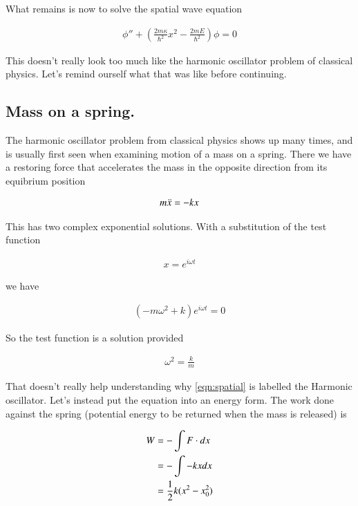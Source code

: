 \documentclass{article}
\begin{document}
What remains is now to solve the spatial wave equation

\begin{align}\label{eqn:spatial}
\phi'' + \left( \frac{2 m \kappa}{\hbar^2} x^2 - \frac{2m E}{\hbar^2}\right) \phi = 0
\end{align}

This doesn't really look too much like the harmonic oscillator problem of classical physics.  Let's remind ourself
what that was like before continuing.

\subsection{ Mass on a spring. }

The harmonic oscillator problem from classical physics
shows up many times, and is usually first seen when examining motion
of a mass on a spring.  There we have a restoring force that accelerates the
mass in the opposite direction from its equibrium position

\begin{align}
m \ddot{x} = -k x
\end{align}

This has two complex exponential solutions.  With a substitution of the test function

\begin{align*}
x = e^{i \omega t}
\end{align*}

we have

\begin{align*}
(-m \omega^2 + k) e^{i \omega t} = 0
\end{align*}

So the test function is a solution provided

\begin{align*}
\omega^2 = \frac{k}{m}
\end{align*}

That doesn't really help understanding why \ref{eqn:spatial} is labelled the Harmonic oscillator.  Let's instead put the equation into an energy form.  The work done against the spring
(potential energy to be returned when the mass is released) is

\begin{align*}
W 
&= - \int F \cdot dx \\
&= - \int -kx dx \\
&= \frac{1}{2} k (x^2 - x_0^2)
\end{align*}
\end{document}
